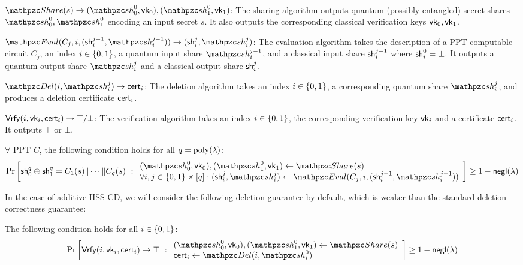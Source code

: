 \begin{description}

\item [Syntax:] $ $
\item $\Sh(s) \rightarrow (\qsh_0^0, \vk_0), (\qsh_1^0,
\vk_1)$: The sharing algorithm outputs quantum
(possibly-entangled) secret-shares $\qsh_0^0, \qsh_1^0$ encoding an
input secret $s$. It also outputs the corresponding classical
verification keys $\mathsf{vk}_0, \mathsf{vk}_1$.

\item $\Ev(C_j, i, (\sh_i^{j-1}, \qsh_i^{j-1})) \rightarrow
(\sh_i^j, \qsh_i^{j})$: The
evaluation algorithm takes the description of a PPT computable
circuit $C_j$, an index $i \in \{0,1\}$, a quantum input share
$\qsh_i^{j-1}$, and a classical input share $\mathsf{sh}_i^{j-1}$ where
$\mathsf{sh}_i^0 = \bot$. It outputs a quantum output share $\qsh_i^j$ and a
classical output share $\mathsf{sh}_i^j$.

\item $\Del(i, \qsh_i^j) \rightarrow \cert_i$: The deletion
algorithm takes an index $i \in \{0,1\}$, a corresponding quantum share
$\qsh_i^j$, and produces a deletion certificate $\mathsf{cert}_i$.

\item $\mathsf{Vrfy}(i, \mathsf{vk}_i, \mathsf{cert}_i) \rightarrow \top/\bot$: The
verification algorithm takes an index $i \in \{0,1\}$, the
corresponding verification key $\mathsf{vk}_i$ and a certificate $\mathsf{cert}_i$.
It outputs $\top$ or $\bot$.

\item [Evaluation Correctness:] $\forall$ PPT $C$, the following
condition holds for all $q = {\mathrm{poly}}(\lambda)$:
\begin{align}
\Pr\left[
\sh_0^q \xor \sh_1^q = C_1(s)\| \cdots \| C_q(s)
\ :
\begin{array}{ll}
(\qsh_0^0, \vk_0), (\qsh_1^0, \vk_1) \gets \Sh(s)\\
\forall i,j \in \bit \times [q]: (\sh_i^j, \qsh_i^j)
\leftarrow \Ev(C_j, i,
(\sh_i^{j-1}, \qsh_i^{j-1}))\\
\end{array}
\right] \geq 1 - \negl(\secp)
\end{align}

In the case of additive HSS-CD, we will consider the following
deletion guarantee by default, which is weaker than the standard
deletion correctness guarantee:

\item [Delete-before-Eval Correctness:] The following condition
holds for all $i \in \{0,1\}$:
\begin{align}
\Pr\left[
\Vrfy(i, \vk_i, \cert_i) \rightarrow \top
\ :
\begin{array}{ll}
(\qsh_0^0, \vk_0), (\qsh_1^0, \vk_1) \gets \Sh(s)\\
\cert_i \leftarrow \Del(i, \qsh_i^0)
\end{array}
\right] \geq 1 - \negl(\secp)
\end{align}



\end{description}
